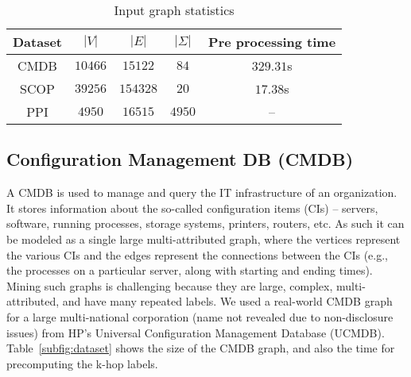 \begin{table}[!h]
\centering
	\begin{tabular}{|c|c|c|c|c|}
	\hline
		Dataset & $|V|$ & $|E|$ & $|\Sigma|$ & \small{Pre processing time}\\
		\hline
		CMDB & $10466$ & $15122$ & $84$ & $329.31$s \\
		SCOP & $39256$ & $154328$ & $20$ & $17.38$s \\
		PPI & $4950$ & $16515$ & $4950$ & --\\
		\hline
		\end{tabular}
\vspace{-0.1in}
\caption{ Input graph statistics}
	\label{subfig:dataset}	
  \label{fig:stats}
\vspace{-0.2in}
\end{table}

\subsection{Configuration Management DB (CMDB)} 

A CMDB is used to manage and query the IT infrastructure of an
organization. It stores information about the so-called configuration
items (CIs) -- servers, software, running processes, storage systems,
printers, routers, etc. As such it can be modeled as a single large
multi-attributed graph, where the vertices represent the various CIs and
the edges represent the connections between the CIs (e.g., the processes
on a particular server, along with starting and ending times).  Mining
such graphs is challenging because they are large, complex,
multi-attributed, and have many repeated labels.  We used a real-world
CMDB graph for a large multi-national corporation (name not revealed due
to non-disclosure issues) from HP's Universal Configuration Management
Database (UCMDB).  Table~\ref{subfig:dataset} shows the size of the CMDB
graph, and also the time for precomputing the k-hop labels. 


